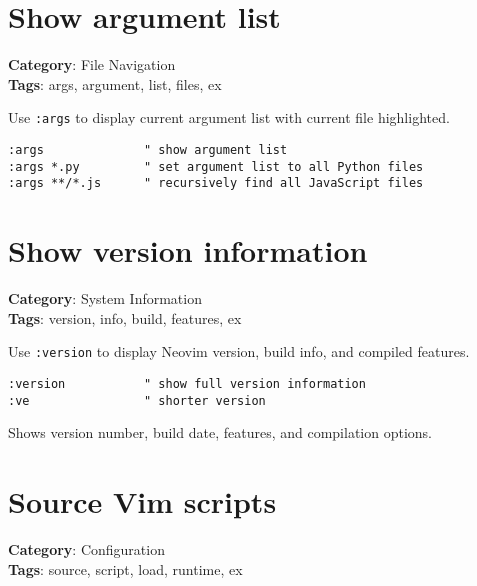 {{{{{\section{Show argument list}

\textbf{Category}: File Navigation\\ \textbf{Tags}: args, argument, list, files, ex
\vspace{0.5cm}

Use {\footnotesize \Verb§:args§} to display current argument list with current file highlighted.

\begin{Exa*}{}
\begin{Verbatim}[fontsize=\footnotesize, breaklines, breakanywhere]
:args              " show argument list
:args *.py         " set argument list to all Python files
:args **/*.js      " recursively find all JavaScript files
\end{Verbatim}
\end{Exa*}

\section{Show version information}

\textbf{Category}: System Information\\ \textbf{Tags}: version, info, build, features, ex
\vspace{0.5cm}

Use {\footnotesize \Verb§:version§} to display Neovim version, build info, and compiled features.

\begin{Exa*}{}
\begin{Verbatim}[fontsize=\footnotesize, breaklines, breakanywhere]
:version           " show full version information
:ve                " shorter version
\end{Verbatim}
\end{Exa*}

Shows version number, build date, features, and compilation options.

\section{Source Vim scripts}

\textbf{Category}: Configuration\\ \textbf{Tags}: source, script, load, runtime, ex
\vspace{0.5cm}

}}}}}
